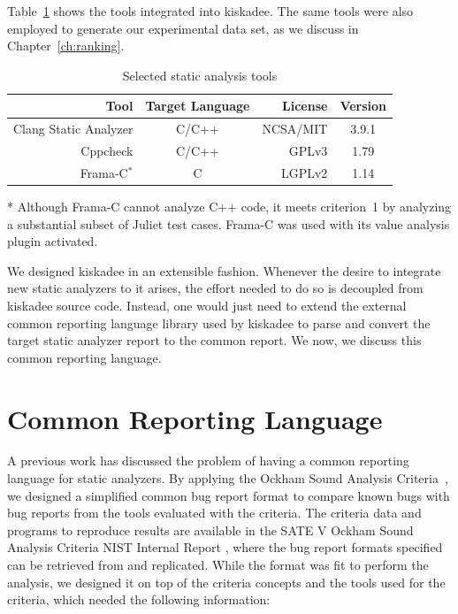 Table~\ref{tab:selected_tools} shows the tools integrated into kiskadee. The same tools were also employed to generate
our experimental data set, as we discuss in Chapter~\ref{ch:ranking}.

  \begin{table}
    \centering
    \begin{threeparttable}
    \begin{center}
        \begin{tabular}{rcrc}\hline
          Tool & Target Language & License & Version \\
        \hline
          Clang Static Analyzer & C/C++ & NCSA/MIT & 3.9.1\\
          Cppcheck & C/C++ & GPLv3 & 1.79\\
          Frama-C$^{*}$ & C & LGPLv2 & 1.14 \\ \hline
        \end{tabular}
        \begin{tablenotes}
          \small
        \item[*] \footnotesize{Although Frama-C cannot analyze C++ code, it meets criterion~1 by analyzing a substantial subset of Juliet test cases. Frama-C was used with its value analysis plugin activated.}
        \end{tablenotes}
        \caption{Selected static analysis tools}\label{tab:selected_tools}
    \end{center}
    \end{threeparttable}
\end{table}

We designed kiskadee in an extensible fashion. Whenever the desire to
integrate new static analyzers to it arises, the effort needed to do so is
decoupled from kiskadee source code. Instead, one would just need to extend the
external common reporting language library used by kiskadee to parse and
convert the target static analyzer report to the common report. We now, we
discuss this common reporting language.

\section{Common Reporting Language}
\label{sec:firehose}

A previous work has discussed the problem of having a common reporting language
for static analyzers. By applying the Ockham Sound Analysis
Criteria~\cite{black_sate_2016}, we designed a simplified common bug report
format to compare known bugs with bug reports from the tools evaluated with the
criteria. The criteria data and programs to reproduce results are available in
the SATE V Ockham Sound Analysis Criteria NIST Internal Report
\cite{black_sate_2016}, where the bug report formats specified can be retrieved
from and replicated. While the format was fit to perform the analysis, we
designed it on top of the criteria concepts and the tools used for the criteria,
which needed the following information:

